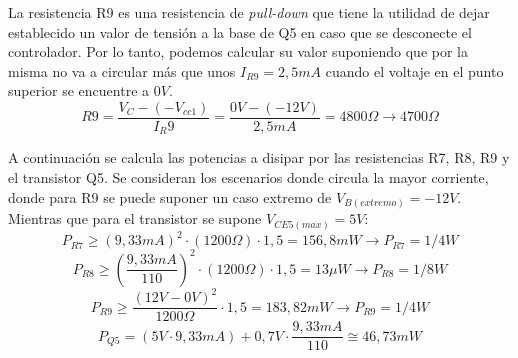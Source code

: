 La resistencia R9 es una resistencia de \textit{pull-down} que tiene la utilidad de dejar establecido un valor de tensión a la base de Q5 en caso que se desconecte el controlador. Por lo tanto, podemos calcular su valor suponiendo que por la misma no va a circular más que unos $I_{R9}=2,5 mA$ cuando el voltaje en el punto superior se encuentre a $0V$.
\begin{equation}
R9=\frac{V_C-(-V_{cc1})}{I_R9}=\frac{0V-(-12V)}{2,5 mA}=4800\Omega \to 4700\Omega 
\end{equation}\par 

A continuación se calcula las potencias a disipar por las resistencias R7, R8, R9 y el transistor Q5. Se consideran los escenarios donde circula la mayor corriente, donde para R9 se puede suponer un caso extremo de $V_{B(extremo)}=-12V$. Mientras que para el transistor se supone $V_{CE5(max)}=5V$:
\begin{equation}
P_{R7}\geq (9,33mA)^2\cdot (1200\Omega )\cdot 1,5=156,8 mW	\to P_{R7}=1/4W
\end{equation}
\begin{equation}
P_{R8}\geq (\frac{9,33mA}{110})^2\cdot (1200\Omega )\cdot 1,5= 13\mu W \to P_{R8}=1/8W
\end{equation}
\begin{equation}
P_{R9}\geq \frac{(12V-0V)^2}{1200\Omega}\cdot 1,5=183,82 mW	\to 	P_{R9}=1/4W
\end{equation}
\begin{equation}
P_{Q5}=(5V\cdot 9,33mA)+0,7V\cdot \frac{9,33mA}{110}\cong 46,73mW
\end{equation}\par 

